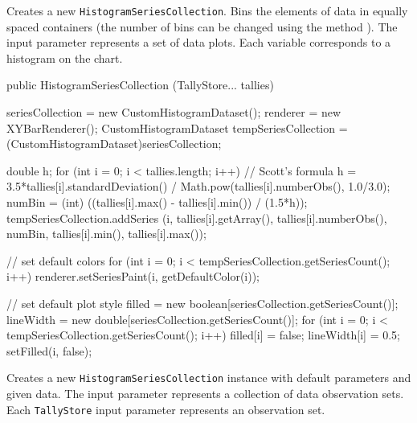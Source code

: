 \begin{tabb}
   Creates a new \texttt{HistogramSeriesCollection}.
   Bins the elements of data in equally spaced containers (the number of bins
   can be changed using the method ).
   The input parameter represents a set of data plots. Each
   variable corresponds
   to a histogram on the chart.
\end{tabb}
\begin{htmlonly}
\end{htmlonly}
\begin{code}

   public HistogramSeriesCollection (TallyStore... tallies) \begin{hide} {
      seriesCollection = new CustomHistogramDataset();
      renderer = new XYBarRenderer();
      CustomHistogramDataset tempSeriesCollection = (CustomHistogramDataset)seriesCollection;

      double h;
      for (int i = 0; i < tallies.length; i++) {
         // Scott's formula
         h = 3.5*tallies[i].standardDeviation() /
                           Math.pow(tallies[i].numberObs(), 1.0/3.0);
         numBin = (int) ((tallies[i].max() - tallies[i].min()) / (1.5*h));
         tempSeriesCollection.addSeries (i, tallies[i].getArray(),
              tallies[i].numberObs(), numBin, tallies[i].min(), tallies[i].max());
      }

      // set default colors
      for (int i = 0; i < tempSeriesCollection.getSeriesCount(); i++) {
         renderer.setSeriesPaint(i, getDefaultColor(i));
      }

      // set default plot style
      filled = new boolean[seriesCollection.getSeriesCount()];
      lineWidth = new double[seriesCollection.getSeriesCount()];
      for (int i = 0; i < tempSeriesCollection.getSeriesCount(); i++) {
         filled[i] = false;
         lineWidth[i] = 0.5;
         setFilled(i, false);
      }
   }\end{hide}
\end{code}
\begin{tabb}
   Creates a new \texttt{HistogramSeriesCollection} instance with default
 parameters and given data. The input parameter represents a collection of
 data observation sets. Each \texttt{TallyStore} input parameter represents
 an observation set.
\end{tabb}
\begin{htmlonly}
\end{htmlonly}
